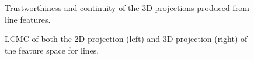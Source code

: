 \begin{figure}[H]
	\centering
	\caption{Trustworthiness and continuity of the 3D projections produced from line features.}\label{fig:TC_3d_blobs}
\end{figure}

\begin{figure}[H]
	\centering
	\caption{LCMC of both the 2D projection (left) and 3D projection (right) of the feature space for lines.}\label{fig:LCMC_blobs}
\end{figure}

